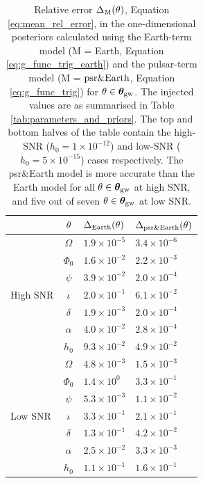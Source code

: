 \documentclass[fleqn,usenatbib,useAMS]{mnras}
\begin{document}
\begin{table}
	\centering
		\begin{tabular}{lcll}
			\toprule
			&$\theta$ & $\Delta_{\rm Earth}(\theta)$ & $\Delta_{\rm psr \& Earth}(\theta)$  \\
			\hline
			\multirow{7}{2mm}{High SNR} & $\Omega$       & $1.9 \times 10^{-5}$& $3.4 \times 10^{-6}$\\
			& $\Phi_0$ &$1.6 \times 10^{-2}$ &$2.2 \times 10^{-3}$ \\
			& $\psi$ &$3.9 \times 10^{-2}$ &$2.0 \times 10^{-4}$  \\
			& $\iota$ & $2.0 \times 10^{-1}$ & $6.1 \times 10^{-2}$  \\
			& $\delta$ &$1.9 \times10^{-3}$ &$2.0 \times 10^{-4}$  \\
			&$\alpha$ &$4.0 \times 10^{-2}$ &$2.8 \times10^{-4}$  \\
			&$h_0$ & $9.3 \times 10^{-2}$ &$4.9 \times 10^{-2}$  \\
			\hline
			\multirow{7}{2mm}{Low SNR} & $\Omega$       &  $4.8 \times 10^{-3}$ &$1.5 \times 10^{-3}$ \\
			& $\Phi_0$ &$1.4 \times 10^{0}$ & $3.3 \times 10^{-1}$  \\
			& $\psi$ &$5.3 \times 10^{-3}$ &$1.1 \times 10^{-2}$  \\
			& $\iota$ & $3.3 \times 10^{-1}$ & $2.1 \times 10^{-1}$  \\
			& $\delta$ & $1.3 \times 10^{-1}$ & $4.2 \times 10^{-2}$  \\
			&$\alpha$ & $2.5 \times 10^{-2}$ & $3.3 \times 10^{-3}$ \\
			&$h_0$ & $1.1 \times 10^{-1}$ &$1.6 \times 10^{-1}$ \\
			\bottomrule
		\end{tabular}
		\caption{Relative error $\Delta_{\rm M}(\theta)$, Equation \eqref{eq:mean_rel_error}, in the one-dimensional posteriors calculated using the Earth-term model (M = Earth, Equation \eqref{eq:g_func_trig_earth}) and the pulsar-term model (M = $\rm psr \& Earth$, Equation \eqref{eq:g_func_trig}) for $\theta \in \boldsymbol{\theta}_{\rm gw}$. The injected values are as summarised in Table \ref{tab:parameters_and_priors}. The top and bottom halves of the table contain the high-SNR ($h_0 =1 \times 10^{-12}$) and low-SNR ($h_0 = 5 \times 10^{-15}$) cases respectively. The psr\&Earth model is more accurate than the Earth model for all $\theta \in \boldsymbol{\theta}_{\rm gw}$ at high SNR, and five out of seven $\theta \in \boldsymbol{\theta}_{\rm gw}$ at low SNR.}
		\label{tab:posterior_errors}
	\end{table}
\end{document}
